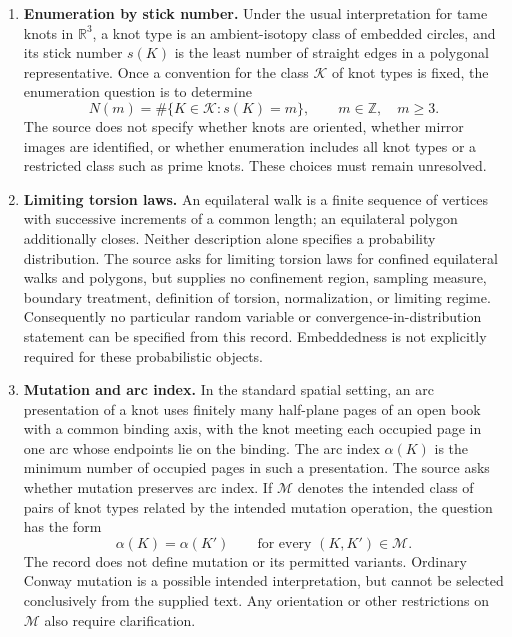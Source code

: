 \documentclass[11pt]{article}
\newcommand{\Z}{\mathbb{Z}}
\newcommand{\R}{\mathbb{R}}
\begin{document}
\begin{enumerate}
The source asks whether the spaces of embedded equilateral arms and unknotted equilateral polygons are connected. It does not explicitly fix ambient dimension, numbers of edges, endpoint constraints, identifications by rigid motions or vertex relabeling, or the quantifiers over these choices. The displayed spatial definitions therefore provide a possible setting, not a uniquely recovered formulation. The source says ``connected''; whether path connectedness is intended is also unresolved.

\item \textbf{Enumeration by stick number.} Under the usual interpretation for tame knots in \(\R^3\), a knot type is an ambient-isotopy class of embedded circles, and its stick number \(s(K)\) is the least number of straight edges in a polygonal representative. Once a convention for the class \(\mathcal K\) of knot types is fixed, the enumeration question is to determine
\[
N(m)=\#\{K\in\mathcal K:s(K)=m\},\qquad m\in\Z,\quad m\geq3.
\]
The source does not specify whether knots are oriented, whether mirror images are identified, or whether enumeration includes all knot types or a restricted class such as prime knots. These choices must remain unresolved.

\item \textbf{Limiting torsion laws.} An equilateral walk is a finite sequence of vertices with successive increments of a common length; an equilateral polygon additionally closes. Neither description alone specifies a probability distribution. The source asks for limiting torsion laws for confined equilateral walks and polygons, but supplies no confinement region, sampling measure, boundary treatment, definition of torsion, normalization, or limiting regime. Consequently no particular random variable or convergence-in-distribution statement can be specified from this record. Embeddedness is not explicitly required for these probabilistic objects.

\item \textbf{Mutation and arc index.} In the standard spatial setting, an arc presentation of a knot uses finitely many half-plane pages of an open book with a common binding axis, with the knot meeting each occupied page in one arc whose endpoints lie on the binding. The arc index \(\alpha(K)\) is the minimum number of occupied pages in such a presentation. The source asks whether mutation preserves arc index. If \(\mathcal M\) denotes the intended class of pairs of knot types related by the intended mutation operation, the question has the form
\[
\alpha(K)=\alpha(K')\qquad\text{for every }(K,K')\in\mathcal M.
\]
The record does not define mutation or its permitted variants. Ordinary Conway mutation is a possible intended interpretation, but cannot be selected conclusively from the supplied text. Any orientation or other restrictions on \(\mathcal M\) also require clarification.


\end{enumerate}
\end{document}
